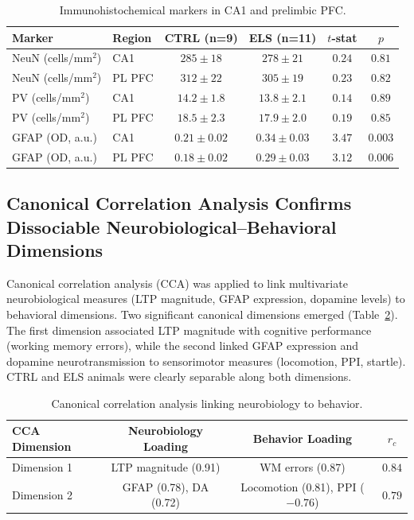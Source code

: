 \documentclass[11pt]{article}
\begin{document}
\begin{table}[H]
\centering
\caption{Immunohistochemical markers in CA1 and prelimbic PFC.}
\label{tab:ihc}
\begin{tabular}{llcccc}
\toprule
\textbf{Marker} & \textbf{Region} & \textbf{CTRL (n=9)} & \textbf{ELS (n=11)} & \textbf{$t$-stat} & \textbf{$p$} \\
\midrule
NeuN (cells/mm$^2$) & CA1 & $285 \pm 18$ & $278 \pm 21$ & $0.24$ & $0.81$ \\
NeuN (cells/mm$^2$) & PL PFC & $312 \pm 22$ & $305 \pm 19$ & $0.23$ & $0.82$ \\
PV (cells/mm$^2$) & CA1 & $14.2 \pm 1.8$ & $13.8 \pm 2.1$ & $0.14$ & $0.89$ \\
PV (cells/mm$^2$) & PL PFC & $18.5 \pm 2.3$ & $17.9 \pm 2.0$ & $0.19$ & $0.85$ \\
GFAP (OD, a.u.) & CA1 & $0.21 \pm 0.02$ & $0.34 \pm 0.03$ & $3.47$ & $0.003$ \\
GFAP (OD, a.u.) & PL PFC & $0.18 \pm 0.02$ & $0.29 \pm 0.03$ & $3.12$ & $0.006$ \\
\bottomrule
\end{tabular}
\end{table}

\subsection{Canonical Correlation Analysis Confirms Dissociable Neurobiological--Behavioral Dimensions}

Canonical correlation analysis (CCA) was applied to link multivariate neurobiological measures (LTP magnitude, GFAP expression, dopamine levels) to behavioral dimensions. Two significant canonical dimensions emerged (Table~\ref{tab:cca}). The first dimension associated LTP magnitude with cognitive performance (working memory errors), while the second linked GFAP expression and dopamine neurotransmission to sensorimotor measures (locomotion, PPI, startle). CTRL and ELS animals were clearly separable along both dimensions.

\begin{table}[H]
\centering
\caption{Canonical correlation analysis linking neurobiology to behavior.}
\label{tab:cca}
\begin{tabular}{lccc}
\toprule
\textbf{CCA Dimension} & \textbf{Neurobiology Loading} & \textbf{Behavior Loading} & \textbf{$r_{c}$} \\
\midrule
Dimension 1 & LTP magnitude (0.91) & WM errors (0.87) & $0.84$ \\
Dimension 2 & GFAP (0.78), DA (0.72) & Locomotion (0.81), PPI ($-0.76$) & $0.79$ \\
\bottomrule
\end{tabular}
\end{table}
\end{document}
